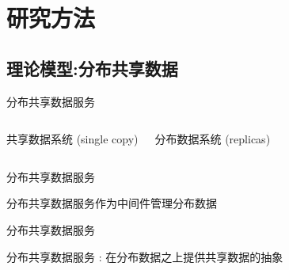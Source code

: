 \section{研究方法}

\subsection{理论模型:分布共享数据}

\begin{frame}{分布共享数据服务}
  \begin{columns}
	  \begin{center}
		共享数据系统 (single copy)
	  \end{center}
	\pause
	  \begin{center}
		分布数据系统 (replicas)
	  \end{center}
  \end{columns}
\end{frame}
\begin{frame}{分布共享数据服务}
  \begin{center}
	分布共享数据服务作为中间件管理分布数据
  \end{center}
\end{frame}
\begin{frame}{分布共享数据服务}
  \begin{center}
	\textcolor{blue!80}{分布共享数据服务 :} 在分布数据之上提供共享数据的抽象
  \end{center}
\end{frame}
